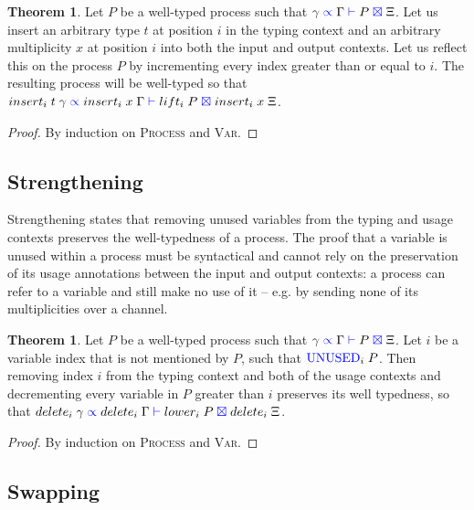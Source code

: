 \documentclass[a4paper,UKenglish,cleveref, autoref, thm-restate,authorcolumns]{lipics-v2019}
\theoremstyle{definition}
\newtheorem{nitheorem}[theorem]{Theorem}
\newcommand{\type}[1]{\textcolor{blue}{\operatorname{#1}}}
\newcommand{\types}[4]{#1 \; \type{\propto} \; #2 \; \type{\vdash} \; #3 \; \type{\boxtimes} \; #4}
\newcommand{\Unused}{\type{UNUSED}}
\begin{document}
\begin{nitheorem}
  \label{thm:weakening}
  Let $P$ be a well-typed process such that $\types{\gamma}{\Gamma}{P}{\Xi}$.
  Let us insert an arbitrary type $t$ at position $i$ in the typing context and an arbitrary multiplicity $x$ at position $i$ into both the input and output contexts.
  Let us reflect this on the process $P$ by incrementing every index greater than or equal to $i$.
  The resulting process will be well-typed so that $\types{insert_i \; t \; \gamma}{insert_i \; x \; \Gamma}{lift_i \; P}{insert_i \; x \; \Xi}$.
\end{nitheorem}
\begin{proof}
  By induction on \textsc{Process} and \textsc{Var}.
\end{proof}

\subsection{Strengthening}
\label{strengthening}

Strengthening states that removing unused variables from the typing and usage contexts preserves the well-typedness of a process.
The proof that a variable is unused within a process must be syntactical and cannot rely on the preservation of its usage annotations between the input and output contexts: a process can refer to a variable and still make no use of it -- e.g. by sending none of its multiplicities over a channel.

\begin{nitheorem}
  \label{thm:strengthening}
  Let $P$ be a well-typed process such that $\types{\gamma}{\Gamma}{P}{\Xi}$.
  Let $i$ be a variable index that is not mentioned by $P$, such that $\Unused_i \; P$.
  Then removing index $i$ from the typing context and both of the usage contexts and decrementing every variable in $P$ greater than $i$ preserves its well typedness, so that $\types{delete_i \; \gamma}{delete_i \; \Gamma}{lower_i \; P}{delete_i \; \Xi}$.
\end{nitheorem}
\begin{proof}
  By induction on \textsc{Process} and \textsc{Var}.
\end{proof}

\subsection{Swapping}
\label{swapping}
\end{document}
